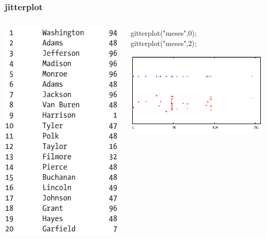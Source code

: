 \documentclass{beamer}
\begin{document}
\begin{frame}
\frametitle{jitterplot}

\begin{columns}

\begin{column}{0.3\textwidth}
\includegraphics[scale=0.2]{jittertable}
\end{column}

\begin{column}{0.7\textwidth}
\begin{center}
gitterplot("meses",0);\\
gitterplot("meses",2);
\end{center}
\includegraphics[scale=0.5]{jitterplot}

\end{column}
\end{columns}

\end{frame}
\end{document}
